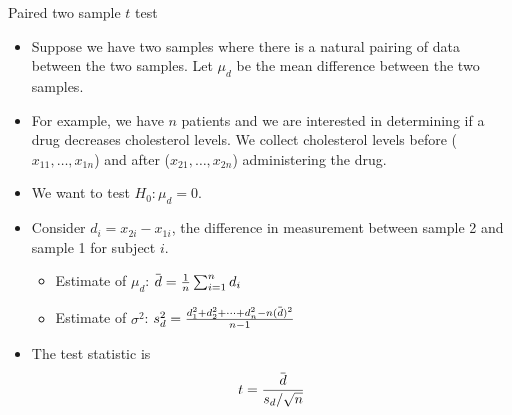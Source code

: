 \documentclass[10pt, xcolor=table]{beamer}
\newcommand*\themecol{\usebeamercolor[fg]{structure}}
\newcommand{\overbar}[1]{\mkern 1.5mu\overline{\mkern-1.5mu#1\mkern-1.5mu}\mkern 1.5mu}
\begin{document}
\begin{frame}{Paired two sample $t$ test}
\begin{itemize}\itemsep2ex
\item Suppose we have two samples where there is a natural pairing of data between the two samples. Let $\mu_d$ be the mean difference between the two samples. 
\item For example, we have $n$ patients and we are interested in determining if a drug decreases cholesterol levels. We collect cholesterol levels before ($x_{11}, \ldots, x_{1n}$) and after ($x_{21}, \ldots, x_{2n}$) administering the drug. 
\item We want to test $H_0: \mu_d = 0$.
\item Consider $d_i = x_{2i} - x_{1i}$, the difference in measurement between sample 2 and sample 1 for subject $i$.
\begin{itemize}
\item Estimate of $\mu_d$: $\overbar{d} = \frac{1}{n} \sum_{i=1}^n d_i$
\item Estimate of $\sigma^2$: $s^2_d = \frac{d_1^2 + d_2^2 + \cdots + d_n^2 - n(\overbar{d})^2}{n-1}$
\end{itemize}
\item The test statistic is
{\themecol
\[
t = \frac{\overbar{d}}{s_d/\sqrt{n}}
\]
}
\end{itemize}
\end{frame}
\end{document}
